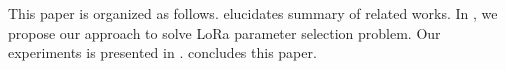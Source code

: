 This paper is organized as follows.
 elucidates summary of related works.
In ,
	we propose our approach to solve LoRa parameter selection problem.
Our experiments is presented in .
 concludes this paper.



